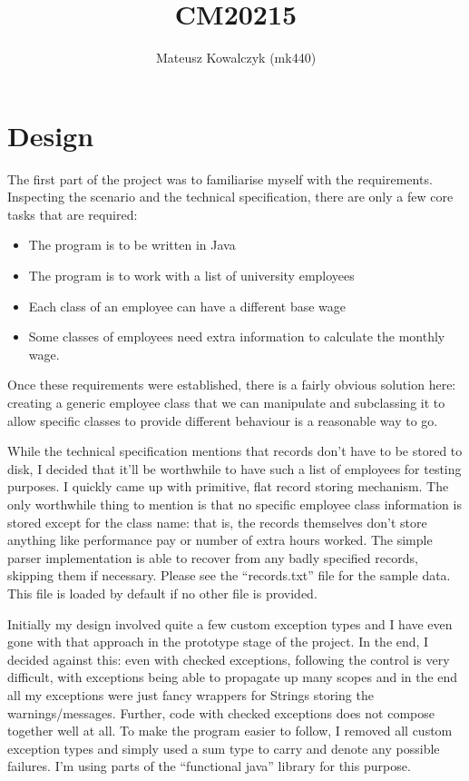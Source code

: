 \documentclass{report}
\begin{document}
\title{CM20215} \author{Mateusz Kowalczyk (mk440)} \maketitle
\section*{Design}

The first part of the project was to familiarise myself with the
requirements. Inspecting the scenario and the technical specification,
there are only a few core tasks that are required:

\begin{itemize}
\item The program is to be written in Java
\item The program is to work with a list of university employees
\item Each class of an employee can have a different base wage
\item Some classes of employees need extra information to calculate
  the monthly wage.
\end{itemize}

Once these requirements were established, there is a fairly obvious
solution here: creating a generic employee class that we can
manipulate and subclassing it to allow specific classes to provide
different behaviour is a reasonable way to go.

While the technical specification mentions that records don't have to
be stored to disk, I decided that it'll be worthwhile to have such a
list of employees for testing purposes. I quickly came up with
primitive, flat record storing mechanism. The only worthwhile thing to
mention is that no specific employee class information is stored
except for the class name: that is, the records themselves don't store
anything like performance pay or number of extra hours worked. The
simple parser implementation is able to recover from any badly
specified records, skipping them if necessary. Please see the
``records.txt'' file for the sample data. This file is loaded by
default if no other file is provided.

Initially my design involved quite a few custom exception types and I
have even gone with that approach in the prototype stage of the
project. In the end, I decided against this: even with checked
exceptions, following the control is very difficult, with exceptions
being able to propagate up many scopes and in the end all my
exceptions were just fancy wrappers for Strings storing the
warnings/messages. Further, code with checked exceptions does not
compose together well at all.  To make the program easier to follow, I
removed all custom exception types and simply used a sum type to carry
and denote any possible failures. I'm using parts of the ``functional
java'' library for this purpose.
\end{document}
